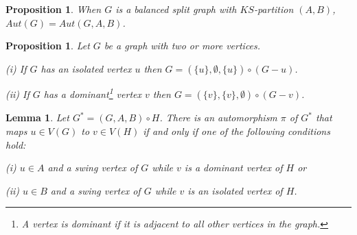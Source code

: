 \documentclass[11pt]{article}
\newtheorem{lemma}[df]{Lemma}
\newtheorem{proposition}[df]{Proposition}
\begin{document}
\begin{proposition}
{\bf  \cite{Ch25}}
   When $G$ is a balanced split graph with $KS$-partition $(A,B)$,  $Aut(G) = Aut(G, A, B)$. 
   \label{balanced}
  \end{proposition}

\smallskip

\begin{proposition} {\bf  \cite{Ch25}}
  \label{decomposable}  Let $G$ be a graph with two or more vertices. 

\noindent (i) If $G$ has an isolated vertex $u$ then $G = (\{u\}, \emptyset, \{u\}) \circ (G - u)$. %
  

\noindent (ii) If $G$ has a dominant\footnote{A vertex is {\it dominant} if it is adjacent to all other vertices in the graph.
}  vertex $v$  then $G = (\{v\}, \{v\}, \emptyset) \circ (G-v)$. %
   
 
 
\end{proposition}

\smallskip


\begin{lemma}
 \label{autchar3}
 {\bf  \cite{Ch25}} Let $G^* = (G,A,B) \circ H$.  There is an automorphism $\pi$ of $G^*$ that maps $u \in V(G)$ to $v \in V(H)$ if and only if one of the following conditions hold:
 
 \noindent (i) $u \in A$ and a swing vertex of $G$ while $v$ is a dominant vertex of $H$ or 
 
 \noindent (ii) $u \in B$ and a swing vertex of $G$ while $v$ is an isolated vertex of $H$.
 
  


\end{lemma}
\end{document}
